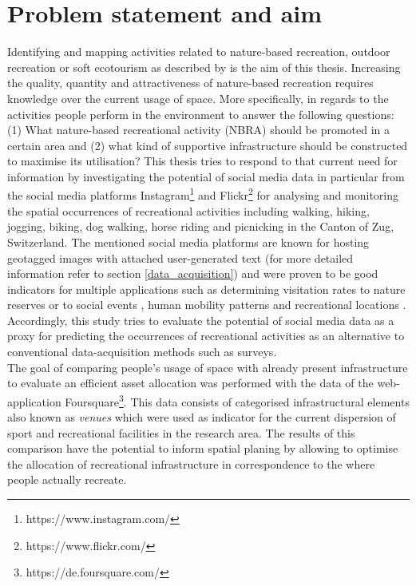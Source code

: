 \section{Problem statement and aim}
Identifying and mapping activities related to nature-based recreation, outdoor recreation or soft ecotourism as described by \textcite{Deng2002, Balmford2009} is the aim of this thesis.
Increasing the quality, quantity and attractiveness of nature-based recreation requires knowledge over the current usage of space. More specifically, in regards to the activities people perform in the environment to answer the following questions: (1) What nature-based recreational activity (NBRA) should be promoted in a certain area and (2) what kind of supportive infrastructure should be constructed to maximise its utilisation? This thesis tries to respond to that current need for information by investigating the potential of social media data in particular from the social media platforms Instagram\footnote{https://www.instagram.com/} and Flickr\footnote{https://www.flickr.com/} for analysing and monitoring the spatial occurrences of recreational activities including walking, hiking, jogging, biking, dog walking, horse riding and picnicking in the Canton of Zug, Switzerland. The mentioned social media platforms are known for hosting geotagged images with attached user-generated text (for more detailed information refer to section \ref{data_acquisition}) and were proven to be good indicators for multiple applications such as determining visitation rates to nature reserves \parencite{Tenkanen2017, Heikinheimo2017, Keeler2015, Wood2013} or to social events \parencite{Pettersson2011}, human mobility patterns \parencite{Barchiesi2015, Grossenbacher2014} and recreational locations \parencite{Weyland2014, Hill2006, Neuvonen2010}.
Accordingly, this study tries to evaluate the potential of social media data as a proxy for predicting the occurrences of recreational activities as an alternative to conventional data-acquisition methods such as surveys.\\
The goal of comparing people's usage of space with already present infrastructure to evaluate an efficient asset allocation was performed with the data of the web-application Foursquare\footnote{https://de.foursquare.com/}. This data consists of categorised infrastructural elements also known as \textit{venues} which were used as indicator for the current dispersion of sport and recreational facilities in the research area. The results of this comparison have the potential to inform spatial planing by allowing to optimise the allocation of recreational infrastructure in correspondence to the where people actually recreate.

